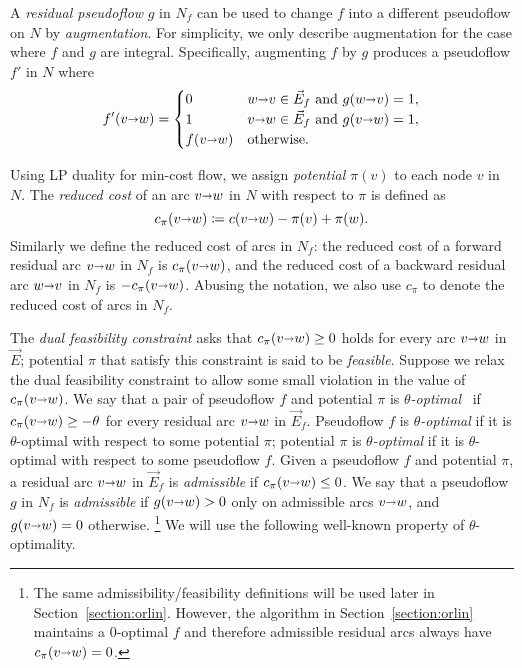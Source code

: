 \documentclass[11pt]{article}
\makeatletter
\def\eps{\varepsilon}
\def\arcto{\mathord\shortrightarrow}
\def\arc#1#2{#1\arcto#2}
\numberwithin{figure}{section}
\def\EMPH#1{\textcolor{BrickRed}{{\emph{#1}}}}
\def\n@te#1{\textsf{\boldmath \textbf{$\langle\!\langle$#1$\rangle\!\rangle$}}\leavevmode}
\def\note#1{\textcolor{red}{\n@te{#1}}}
\makeatother
\begin{document}
A \EMPH{residual pseudoflow} $g$ in $N_f$ can be used to change $f$ into a
different pseudoflow on $N$ by \EMPH{augmentation}.
For simplicity, we only describe augmentation for the case where $f$ and $g$ are integral.
Specifically, augmenting $f$ by $g$ produces a pseudoflow $f'$ in $N$ where
\[
f'(\arc vw) = \begin{cases}
	0 & {\arc wv} \in \vec{E}_f \text{ and } g(\arc wv) = 1, \\
	1 & {\arc vw} \in \vec{E}_f \text{ and } g(\arc vw) = 1, \\
	f(\arc vw) & \text{otherwise.}
\end{cases}
\]

Using LP duality for min-cost flow, we assign \EMPH{potential $\pi(v)$} to each node $v$ in $N$.
The \EMPH{reduced cost} of an arc $\arc{v}{w}$ in $N$ with respect to $\pi$ is
defined as
\[
c_\pi(\arc vw) \coloneqq c(\arc vw) - \pi(v) + \pi(w).
\]
Similarly we define the reduced cost of arcs in $N_f$: the reduced cost of a
forward residual arc $\arc vw$ in $N_f$ is $c_\pi(\arc vw)$, and the reduced cost of a
backward residual arc $\arc wv$ in $N_f$ is $-c_\pi(\arc vw)$.
Abusing the notation, we also use $c_\pi$ to denote the reduced cost of arcs in
$N_f$.

The \EMPH{dual feasibility constraint} asks that $c_\pi(\arc vw) \geq 0$ holds
for every arc $\arc vw$ in $\vec{E}$;
potential $\pi$ that satisfy this constraint is said to be \EMPH{feasible}.
Suppose we relax the dual feasibility constraint to allow some small violation
in the value of $c_\pi(\arc vw)$.
We say that a pair of pseudoflow $f$ and potential $\pi$ is
\EMPH{$\theta$-optimal}~\cite{T85,BE87}
if $c_\pi(\arc vw) \geq -\theta$ for every residual arc $\arc vw$ in $\vec{E}_f$.
Pseudoflow $f$ is \emph{$\theta$-optimal} if it is $\theta$-optimal with
respect to some potential $\pi$;
potential $\pi$ is \emph{$\theta$-optimal} if it is $\theta$-optimal with
respect to some pseudoflow $f$.
Given a pseudoflow $f$ and potential $\pi$, a residual arc $\arc vw$ in
$\vec{E}_f$ is \EMPH{admissible} if $c_\pi(\arc vw) \leq 0$.
We say that a pseudoflow $g$ in $N_f$ is \EMPH{admissible} if $g(\arc vw) > 0$
only on admissible arcs $\arc vw$, and $g(\arc vw) = 0$ otherwise.%
\footnote{The same admissibility/feasibility definitions will be used later in
	Section~\ref{section:orlin}.
	However, the algorithm in Section~\ref{section:orlin} maintains a
	0-optimal $f$ and therefore admissible residual arcs always have
	$c_\pi(\arc vw) = 0$.}
We will use the following well-known property of $\theta$-optimality.
\end{document}

